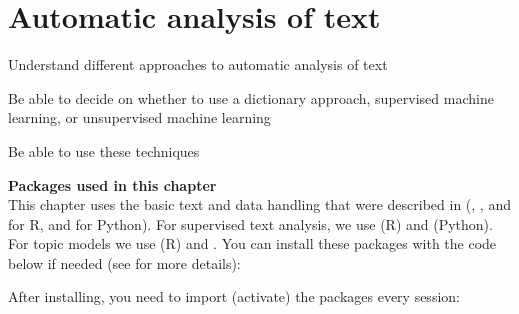 \chapter{ Automatic analysis of text}
\label{chap:text}



\begin{abstract}{Abstract}
  In this chapter, we discuss different approaches to the automatic analysis of text; or automated content analysis. We combine techniques from earlier chapters, such as transforming texts into a matrix of term frequencies and machine learning. In particular, we describe three different approaches (dictionary-based analyses, supervised machine learning, unsupervised machine learning). The chapter provides guidance on how to conduct such analyses, and also on how to decide which of the approaches is most suitable for which types of questions.
\end{abstract}


\begin{objectives}
\item Understand different approaches to automatic analysis of text
\item Be able to decide on whether to use a dictionary approach, supervised machine learning, or unsupervised machine learning
\item Be able to use these techniques
\end{objectives}


\newpage
\begin{feature}
  \textbf{Packages used in this chapter}\\
  This chapter uses the basic text and data handling that were described in  (, , and  for R,  and for Python).
  For supervised text analysis, we use  (R) and  (Python).
  For topic models we use  (R) and .
  You can install these packages with the code below if needed  (see  for more details):


\noindent After installing, you need to import (activate) the packages every session:

\end{feature}

